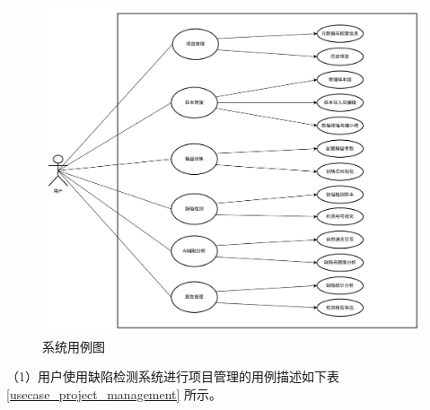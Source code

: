 \documentclass[
  ]{njuthesis}
\begin{document}
\begin{figure}[H]
    \centering
    \includegraphics[width=\textwidth]{images/用例图.png}
    \caption{系统用例图}
    \label{系统用例图}
\end{figure}

（1）用户使用缺陷检测系统进行项目管理的用例描述如下表 \ref{usecase_project_management} 所示。
\end{document}
